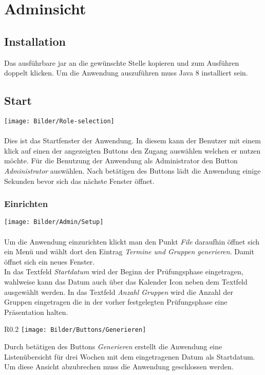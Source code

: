 \section{Adminsicht}

\subsection{Installation}
Das ausführbare jar an die gewünschte Stelle kopieren und zum Ausführen doppelt klicken.
Um die Anwendung auszuführen muss Java 8 installiert sein. 

\subsection{Start}
	\texttt{[image: Bilder/Role-selection]}
	\\
	\\
Dies ist das Startfenster der Anwendung. In diesem kann der Benutzer mit einem klick auf einen der angezeigten Buttons den Zugang auswählen welchen er nutzen möchte. Für die Benutzung der Anwendung als Administrator den Button \textit{Administrator} auswählen. Nach betätigen des Buttons lädt die Anwendung einige Sekunden bevor sich das nächste Fenster öffnet.



\subsubsection{Einrichten}
	\texttt{[image: Bilder/Admin/Setup]}
	\\
	\\
Um die Anwendung einzurichten klickt man den Punkt \textit{File} daraufhin öffnet sich ein Menü und wählt dort den Eintrag \textit{Termine und Gruppen generieren}. Damit öffnet sich ein neues Fenster. \\In das Textfeld \textit{Startdatum} wird der Beginn der Prüfungsphase eingetragen, wahlweise kann das Datum auch über das Kalender Icon neben dem Textfeld ausgewählt werden. In das Textfeld \textit{Anzahl Gruppen} wird die Anzahl der Gruppen eingetragen die in der vorher festgelegten Prüfungsphase eine Präsentation halten. 
\\
\begin{wrapfigure}{R}{0.2\textwidth}
	\centering
	\texttt{[image: Bilder/Buttons/Generieren]}
\end{wrapfigure}

Durch betätigen des Buttons \textit{Generieren} erstellt die Anwendung eine Listenübersicht für drei Wochen mit dem eingetragenen Datum als Startdatum. Um diese Ansicht abzubrechen muss die Anwendung geschlossen werden.


